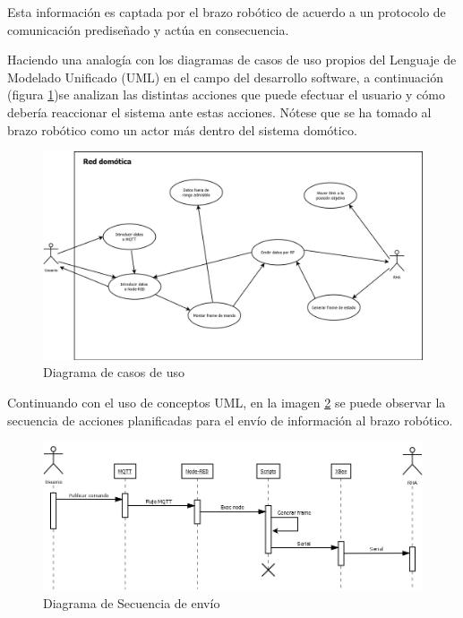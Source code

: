Esta información es captada por el brazo robótico de acuerdo a un protocolo de comunicación prediseñado y actúa en consecuencia.

Haciendo una analogía con los diagramas de casos de uso propios del Lenguaje de Modelado Unificado (UML) en el campo del desarrollo software, a continuación (figura \ref{fig:diacasos})se analizan las distintas acciones que puede efectuar el usuario y cómo debería reaccionar el sistema ante estas acciones. Nótese que se ha tomado al brazo robótico como un actor más dentro del sistema domótico.

\begin{figure}[tb]
\centering
\includegraphics[width=1\textwidth]{figuras/DiaCasos.png}
\caption{Diagrama de casos de uso}
\label{fig:diacasos}
\end{figure}

Continuando con el uso de conceptos UML, en la imagen \ref{fig:diasecuencia} se puede observar la secuencia de acciones planificadas para el envío de información al brazo robótico.

\begin{figure}[tb]
\centering
\includegraphics[width=1\textwidth]{figuras/DiaSecuencia.png}
\caption{Diagrama de Secuencia de envío}
\label{fig:diasecuencia}
\end{figure}


